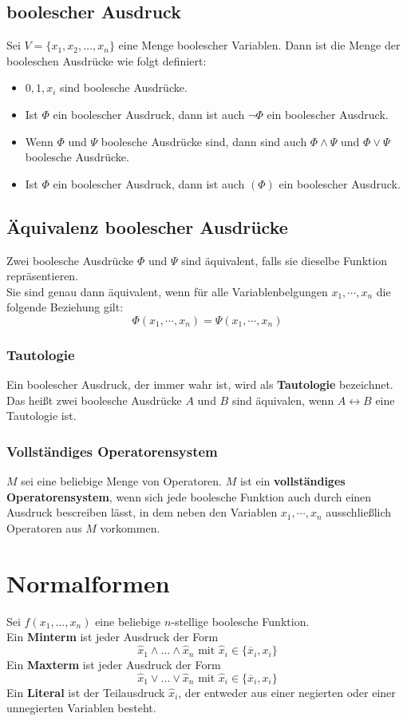 \documentclass[12pt]{article}
\begin{document}
\subsection{boolescher Ausdruck}
Sei $V = \{x_1, x_2, \dots, x_n\}$ eine Menge boolescher Variablen. Dann ist die Menge der booleschen Ausdrücke wie folgt definiert: \\
\begin{itemize}
    \item $0,1,x_i$ sind boolesche Ausdrücke.
    \item Ist $\Phi$ ein boolescher Ausdruck, dann ist auch $\neg \Phi$ ein boolescher Ausdruck.
    \item Wenn $\Phi$ und $\Psi$ boolesche Ausdrücke sind, dann sind auch $\Phi \land \Psi$ und $\Phi \lor \Psi$ boolesche Ausdrücke.
    \item Ist $\Phi$ ein boolescher Ausdruck, dann ist auch $(\Phi)$ ein boolescher Ausdruck.
\end{itemize}
\subsection{Äquivalenz boolescher Ausdrücke}
Zwei boolesche Ausdrücke $\Phi$ und $\Psi$ sind äquivalent, falls sie dieselbe Funktion repräsentieren. \\ 
Sie sind genau dann äquivalent, wenn für alle Variablenbelgungen $x_1, \cdots, x_n$ die folgende Beziehung gilt:
\[\Phi(x_1,\cdots,x_n) = \Psi(x_1,\cdots,x_n)\]
\subsubsection{Tautologie}
Ein boolescher Ausdruck, der immer wahr ist, wird als \textbf{Tautologie} bezeichnet.\\
Das heißt zwei boolesche Ausdrücke $A$ und $B$ sind äquivalen, wenn $A \leftrightarrow B$ eine Tautologie ist.
\subsubsection{Vollständiges Operatorensystem}
$M$ sei eine beliebige Menge von Operatoren. $M$ ist ein \textbf{vollständiges Operatorensystem}, wenn sich jede boolesche Funktion auch durch einen Ausdruck bescreiben lässt, in dem neben den Variablen $x_1, \cdots, x_n$ ausschließlich Operatoren aus $M$ vorkommen.
\section{Normalformen}
Sei $f(x_1, \dots, x_n)$ eine beliebige $n$-stellige boolesche Funktion. \\
Ein \textbf{Minterm} ist jeder Ausdruck der Form
\[\hat{x}_1 \land \dots \land \hat{x}_n \text{ mit } \hat{x}_i \in \{\overline{x}_i, x_i\}\]
Ein \textbf{Maxterm} ist jeder Ausdruck der Form
\[\hat{x}_1 \lor \dots \lor \hat{x}_n \text{ mit } \hat{x}_i \in \{\overline{x}_i, x_i\}\]
Ein \textbf{Literal} ist der Teilausdruck $\hat{x}_i$, der entweder aus einer negierten oder einer unnegierten Variablen besteht.
\end{document}
